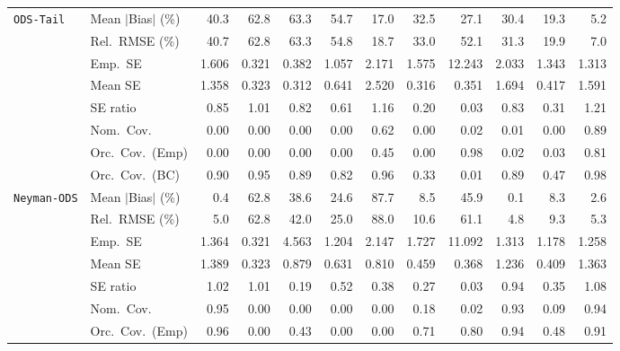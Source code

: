 \begin{landscape}
\begin{longtable}{llrrrrrrrrrr}
\addlinespace[2pt]
\quad \texttt{ODS-Tail} & Mean $|$Bias$|$ (\%) & 40.3 & 62.8 & 63.3 & 54.7 & \cellcolor{ranktwo}17.0 & 32.5 & 27.1 & 30.4 & \cellcolor{rankthree}19.3 & \cellcolor{rankone}5.2 \\
 & Rel.\ RMSE (\%) & 40.7 & 62.8 & 63.3 & 54.8 & \cellcolor{ranktwo}18.7 & 33.0 & 52.1 & 31.3 & \cellcolor{rankthree}19.9 & \cellcolor{rankone}7.0 \\
 & Emp.\ SE & 1.606 & 0.321 & 0.382 & 1.057 & 2.171 & 1.575 & 12.243 & 2.033 & 1.343 & 1.313 \\
 & Mean SE & 1.358 & 0.323 & 0.312 & 0.641 & 2.520 & 0.316 & 0.351 & 1.694 & 0.417 & 1.591 \\
 & SE ratio & \cellcolor{ranktwo}0.85 & \cellcolor{rankone}1.01 & 0.82 & 0.61 & \cellcolor{rankthree}1.16 & 0.20 & 0.03 & 0.83 & 0.31 & 1.21 \\
 & Nom.\ Cov. & 0.00 & 0.00 & 0.00 & 0.00 & \cellcolor{ranktwo}0.62 & 0.00 & \cellcolor{rankthree}0.02 & 0.01 & 0.00 & \cellcolor{rankone}0.89 \\
 & Orc.\ Cov.\ (Emp) & 0.00 & 0.00 & 0.00 & 0.00 & \cellcolor{rankthree}0.45 & 0.00 & \cellcolor{rankone}0.98 & 0.02 & 0.03 & \cellcolor{ranktwo}0.81 \\
 & Orc.\ Cov.\ (BC) & 0.90 & \cellcolor{rankone}0.95 & 0.89 & 0.82 & \cellcolor{ranktwo}0.96 & 0.33 & 0.01 & 0.89 & 0.47 & \cellcolor{rankthree}0.98 \\
\addlinespace[2pt]
\quad \texttt{Neyman-ODS} & Mean $|$Bias$|$ (\%) & \cellcolor{ranktwo}0.4 & 62.8 & 38.6 & 24.6 & 87.7 & 8.5 & 45.9 & \cellcolor{rankone}0.1 & 8.3 & \cellcolor{rankthree}2.6 \\
 & Rel.\ RMSE (\%) & \cellcolor{ranktwo}5.0 & 62.8 & 42.0 & 25.0 & 88.0 & 10.6 & 61.1 & \cellcolor{rankone}4.8 & 9.3 & \cellcolor{rankthree}5.3 \\
 & Emp.\ SE & 1.364 & 0.321 & 4.563 & 1.204 & 2.147 & 1.727 & 11.092 & 1.313 & 1.178 & 1.258 \\
 & Mean SE & 1.389 & 0.323 & 0.879 & 0.631 & 0.810 & 0.459 & 0.368 & 1.236 & 0.409 & 1.363 \\
 & SE ratio & \cellcolor{ranktwo}1.02 & \cellcolor{rankone}1.01 & 0.19 & 0.52 & 0.38 & 0.27 & 0.03 & \cellcolor{rankthree}0.94 & 0.35 & 1.08 \\
 & Nom.\ Cov. & \cellcolor{rankone}0.95 & 0.00 & 0.00 & 0.00 & 0.00 & 0.18 & 0.02 & \cellcolor{rankthree}0.93 & 0.09 & \cellcolor{ranktwo}0.94 \\
 & Orc.\ Cov.\ (Emp) & \cellcolor{rankone}0.96 & 0.00 & 0.43 & 0.00 & 0.00 & 0.71 & \cellcolor{rankthree}0.80 & \cellcolor{rankone}0.94 & 0.48 & \cellcolor{ranktwo}0.91 \\

\end{longtable}
\end{landscape}
